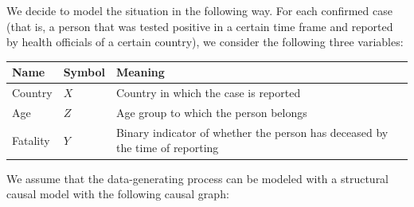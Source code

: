 We decide to model the situation in the following way.
For each confirmed case (that is, a person that was tested positive in a certain time frame and reported by health officials of a certain country), we consider the following three variables:
\begin{center}\small\begin{tabular}{llll}
  Name & Symbol & Meaning \\
  \hline
  Country  & $X$ & Country in which the case is reported \\
  Age      & $Z$ & Age group to which the person belongs \\
  Fatality & $Y$ & Binary indicator of whether the person has deceased by the time of reporting
\end{tabular}\end{center}
We assume that the data-generating process can be modeled with a structural causal model with the following causal graph:
\begin{center}\end{center}
